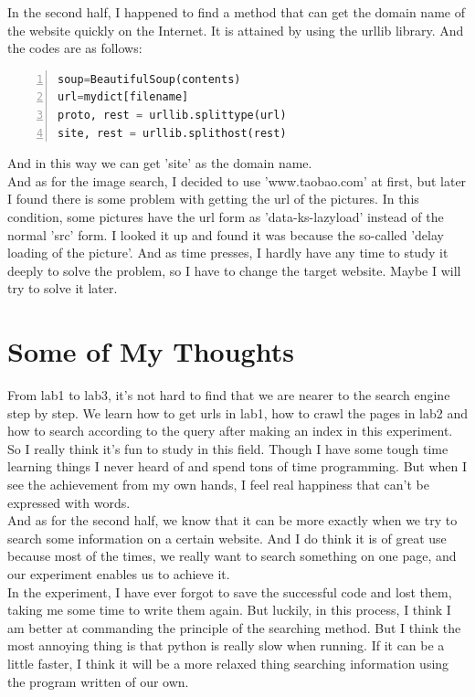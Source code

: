 \documentclass{article}
\begin{document}
In the second half, I happened to find a method that can get the domain name of the website quickly on the Internet. It is attained by using the urllib library. And the codes are as follows:\\
\begin{lstlisting}[language=python,numbers=left,frame=leftline]
soup=BeautifulSoup(contents)
url=mydict[filename]
proto, rest = urllib.splittype(url)
site, rest = urllib.splithost(rest)
\end{lstlisting}
And in this way we can get 'site' as the domain name.\\
And as for the image search, I decided to use 'www.taobao.com' at first, but later I found there is some problem with getting the url of the pictures. In this condition, some pictures have the url form as 'data-ks-lazyload' instead of the normal 'src' form. I looked it up and found it was because the so-called 'delay loading of the picture'. And as time presses, I hardly have any time to study it deeply to solve the problem, so I have to change the target website. Maybe I will try to solve it later.
\section{Some of My Thoughts}
From lab1 to lab3, it's not hard to find that we are nearer to the search engine step by step. We learn how to get urls in lab1, how to crawl the pages in lab2 and how to search according to the query after making an index in this experiment. So I really think it's fun to study in this field. Though I have some tough time learning things I never heard of and spend tons of time programming. But when I see the achievement from my own hands, I feel real happiness that can't be expressed with words.\\
And as for the second half, we know that it can be more exactly when we try to search some information on a certain website. And I do think it is of great use because most of the times, we really want to search something on one page, and our experiment enables us to achieve it.\\
In the experiment, I have ever forgot to save the successful code and lost them, taking me some time to write them again. But luckily, in this process, I think I am better at commanding the principle of the searching method. But I think the most annoying thing is that python is really slow when running. If it can be a little faster, I think it will be a more relaxed thing searching information using the program written of our own.
\end{document}
